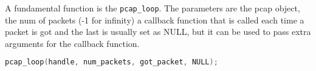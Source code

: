 A fundamental function is the \lstinline|pcap_loop|. The parameters are the pcap object,
the num of packets (-1 for infinity) a callback function that is called each time a packet
is got and the last is usually set as NULL, but it can be used to pass extra arguments for the
callback function.

\begin{lstlisting}[frame= single, language=C, caption=Pcap functions called to start getting the packets on the network (Error handling omitted).]
pcap_loop(handle, num_packets, got_packet, NULL);
\end{lstlisting}











